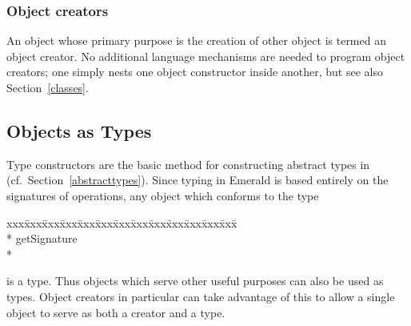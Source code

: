 \subsubsection{Object creators}
An object whose primary purpose is the creation of other object is termed an
object creator.  No additional language mechanisms are needed to program
object creators; one simply nests one object constructor inside another, but
see also Section~\ref{classes}.

\subsection{Objects as Types}
\label{objectsastypes}
Type constructors are the basic method for
constructing abstract types in \emd{} (cf.~Sec\-tion~\ref{abstracttypes}). 
Since typing in Emerald is based entirely on the signatures of operations,
any object which conforms to the type

{\it\begin{minipage}{\textwidth}\begin{tabbing}
xxx\=xxx\=xxx\=xxx\=xxx\=xxx\=xxx\=xxx\=xxx\=xxx\=xxx\=xxx\=xxx\=\+\kill%
  \+\\*{}%
   getSignature \returns{} \/\LB{}\/\RB{}\-\\*{}%
 
\end{tabbing}\end{minipage}}

is a type.  Thus objects which serve other useful purposes can also be used
as types.  Object creators in particular can take advantage of this to
allow a single object to serve as both a creator and a type.

